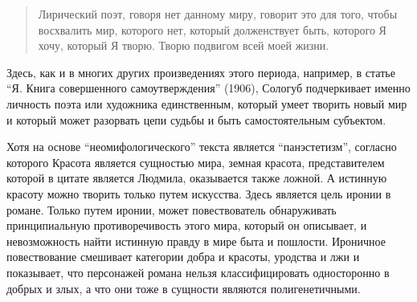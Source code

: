 \documentclass[12pt,a4paper]{article}
\begin{document}
\begin{quote}
 Лирический поэт, говоря нет данному миру, говорит это для того, чтобы восхвалить мир, которого нет, который долженствует быть, которого Я хочу, который Я творю. Творю подвигом всей моей жизни.

\parencite[170.]{sologub1991}
 \end{quote}

 Здесь, как и в многих других произведениях этого периода, например, в статье \enquote{Я. Книга совершенного самоутверждения} (1906),  Сологуб подчеркивает именно личность поэта или художника единственным, который умеет творить новый мир и который может разорвать цепи судьбы и быть самостоятельным субъектом.


Хотя на основе \enquote{неомифологического} текста является \enquote{панэстетизм}, согласно которого Красота является сущностью мира, земная красота, представителем которой в цитате является Людмила, оказывается также ложной. А истинную красоту можно творить только путем искусства. Здесь является цель иронии в романе. Только путем иронии, может повествователь обнаруживать принципиальную противоречивость этого мира, который он описывает, и невозможность найти истинную правду в мире быта и пошлости. Ироничное повествование смешивает категории добра и красоты, уродства и лжи и показывает, что персонажей романа нельзя классифицировать односторонно в добрых и злых, а что они тоже в сущности являются полигенетичными.  







\end{document}
